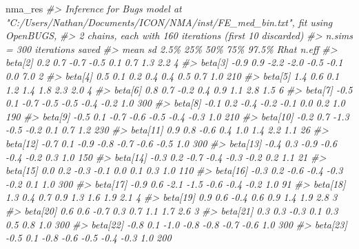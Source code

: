 \documentclass[
]{article}
\newenvironment{Shaded}{\begin{snugshade}}{\end{snugshade}}
\newcommand{\CommentTok}[1]{\textcolor[rgb]{0.56,0.35,0.01}{\textit{#1}}}
\newcommand{\NormalTok}[1]{#1}
\begin{document}
\begin{Shaded}
\begin{Highlighting}[]
\NormalTok{nma\_res}
\CommentTok{\#\textgreater{} Inference for Bugs model at "C:/Users/Nathan/Documents/ICON/NMA/inst/FE\_med\_bin.txt", fit using OpenBUGS,}
\CommentTok{\#\textgreater{}  2 chains, each with 160 iterations (first 10 discarded)}
\CommentTok{\#\textgreater{}  n.sims = 300 iterations saved}
\CommentTok{\#\textgreater{}            mean    sd  2.5\%   25\%   50\%   75\%  97.5\% Rhat n.eff}
\CommentTok{\#\textgreater{} beta[2]     0.2   0.7  {-}0.7  {-}0.5   0.1   0.7    1.3  2.2     4}
\CommentTok{\#\textgreater{} beta[3]    {-}0.9   0.9  {-}2.2  {-}2.0  {-}0.5  {-}0.1    0.0  7.0     2}
\CommentTok{\#\textgreater{} beta[4]     0.5   0.1   0.2   0.4   0.4   0.5    0.7  1.0   210}
\CommentTok{\#\textgreater{} beta[5]     1.4   0.6   0.1   1.2   1.4   1.8    2.3  2.0     4}
\CommentTok{\#\textgreater{} beta[6]     0.8   0.7  {-}0.2   0.4   0.9   1.1    2.8  1.5     6}
\CommentTok{\#\textgreater{} beta[7]    {-}0.5   0.1  {-}0.7  {-}0.5  {-}0.5  {-}0.4   {-}0.2  1.0   300}
\CommentTok{\#\textgreater{} beta[8]    {-}0.1   0.2  {-}0.4  {-}0.2  {-}0.1   0.0    0.2  1.0   190}
\CommentTok{\#\textgreater{} beta[9]    {-}0.5   0.1  {-}0.7  {-}0.6  {-}0.5  {-}0.4   {-}0.3  1.0   210}
\CommentTok{\#\textgreater{} beta[10]   {-}0.2   0.7  {-}1.3  {-}0.5  {-}0.2   0.1    0.7  1.2   230}
\CommentTok{\#\textgreater{} beta[11]    0.9   0.8  {-}0.6   0.4   1.0   1.4    2.2  1.1    26}
\CommentTok{\#\textgreater{} beta[12]   {-}0.7   0.1  {-}0.9  {-}0.8  {-}0.7  {-}0.6   {-}0.5  1.0   300}
\CommentTok{\#\textgreater{} beta[13]   {-}0.4   0.3  {-}0.9  {-}0.6  {-}0.4  {-}0.2    0.3  1.0   150}
\CommentTok{\#\textgreater{} beta[14]   {-}0.3   0.2  {-}0.7  {-}0.4  {-}0.3  {-}0.2    0.2  1.1    21}
\CommentTok{\#\textgreater{} beta[15]    0.0   0.2  {-}0.3  {-}0.1   0.0   0.1    0.3  1.0   110}
\CommentTok{\#\textgreater{} beta[16]   {-}0.3   0.2  {-}0.6  {-}0.4  {-}0.3  {-}0.2    0.1  1.0   300}
\CommentTok{\#\textgreater{} beta[17]   {-}0.9   0.6  {-}2.1  {-}1.5  {-}0.6  {-}0.4   {-}0.2  1.0    91}
\CommentTok{\#\textgreater{} beta[18]    1.3   0.4   0.7   0.9   1.3   1.6    1.9  2.1     4}
\CommentTok{\#\textgreater{} beta[19]    0.9   0.6  {-}0.4   0.6   0.9   1.4    1.9  2.8     3}
\CommentTok{\#\textgreater{} beta[20]    0.6   0.6  {-}0.7   0.3   0.7   1.1    1.7  2.6     3}
\CommentTok{\#\textgreater{} beta[21]    0.3   0.3  {-}0.3   0.1   0.3   0.5    0.8  1.0   300}
\CommentTok{\#\textgreater{} beta[22]   {-}0.8   0.1  {-}1.0  {-}0.8  {-}0.8  {-}0.7   {-}0.6  1.0   300}
\CommentTok{\#\textgreater{} beta[23]   {-}0.5   0.1  {-}0.8  {-}0.6  {-}0.5  {-}0.4   {-}0.3  1.0   200}

\end{Highlighting}
\end{Shaded}
\end{document}
